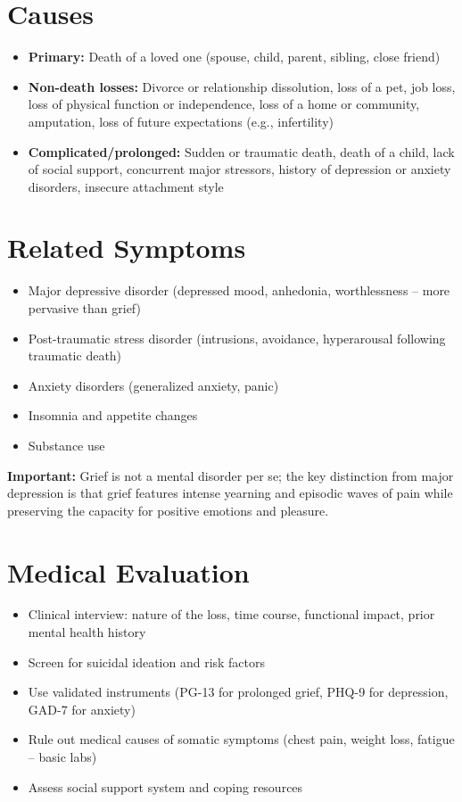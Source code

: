 \section*{Causes}
\begin{itemize}
  \item \textbf{Primary:} Death of a loved one (spouse, child, parent, sibling, close friend)
  \item \textbf{Non-death losses:} Divorce or relationship dissolution, loss of a pet, job loss, loss of physical function or independence, loss of a home or community, amputation, loss of future expectations (e.g., infertility)
  \item \textbf{Complicated/prolonged:} Sudden or traumatic death, death of a child, lack of social support, concurrent major stressors, history of depression or anxiety disorders, insecure attachment style
\end{itemize}

\section*{Related Symptoms}
\begin{itemize}
  \item Major depressive disorder (depressed mood, anhedonia, worthlessness -- more pervasive than grief)
  \item Post-traumatic stress disorder (intrusions, avoidance, hyperarousal following traumatic death)
  \item Anxiety disorders (generalized anxiety, panic)
  \item Insomnia and appetite changes
  \item Substance use
\end{itemize}
\textbf{Important:} Grief is not a mental disorder per se; the key distinction from major depression is that grief features intense yearning and episodic waves of pain while preserving the capacity for positive emotions and pleasure.

\section*{Medical Evaluation}
\begin{itemize}
  \item Clinical interview: nature of the loss, time course, functional impact, prior mental health history
  \item Screen for suicidal ideation and risk factors
  \item Use validated instruments (PG-13 for prolonged grief, PHQ-9 for depression, GAD-7 for anxiety)
  \item Rule out medical causes of somatic symptoms (chest pain, weight loss, fatigue -- basic labs)
  \item Assess social support system and coping resources
\end{itemize}

